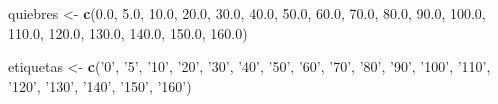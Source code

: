 \documentclass[
  12pt]{article}
\newenvironment{Shaded}{}{}
\newcommand{\FloatTok}[1]{\textcolor[rgb]{0.25,0.63,0.44}{#1}}
\newcommand{\KeywordTok}[1]{\textcolor[rgb]{0.00,0.44,0.13}{\textbf{#1}}}
\newcommand{\NormalTok}[1]{#1}
\newcommand{\StringTok}[1]{\textcolor[rgb]{0.25,0.44,0.63}{#1}}
\begin{document}
\begin{Shaded}
\begin{Highlighting}[]
{{{{{{{{{{\NormalTok{quiebres <-}\StringTok{ }\KeywordTok{c}\NormalTok{(}\FloatTok{0.0}\NormalTok{, }\FloatTok{5.0}\NormalTok{, }\FloatTok{10.0}\NormalTok{, }\FloatTok{20.0}\NormalTok{, }\FloatTok{30.0}\NormalTok{, }\FloatTok{40.0}\NormalTok{, }\FloatTok{50.0}\NormalTok{, }
              \FloatTok{60.0}\NormalTok{, }\FloatTok{70.0}\NormalTok{, }\FloatTok{80.0}\NormalTok{, }\FloatTok{90.0}\NormalTok{, }\FloatTok{100.0}\NormalTok{, }\FloatTok{110.0}\NormalTok{, }
              \FloatTok{120.0}\NormalTok{, }\FloatTok{130.0}\NormalTok{, }\FloatTok{140.0}\NormalTok{, }\FloatTok{150.0}\NormalTok{, }\FloatTok{160.0}\NormalTok{)}

\NormalTok{etiquetas <-}\StringTok{ }\KeywordTok{c}\NormalTok{(}\StringTok{'0'}\NormalTok{, }\StringTok{'5'}\NormalTok{, }\StringTok{'10'}\NormalTok{, }\StringTok{'20'}\NormalTok{, }\StringTok{'30'}\NormalTok{, }\StringTok{'40'}\NormalTok{, }\StringTok{'50'}\NormalTok{,}
               \StringTok{'60'}\NormalTok{, }\StringTok{'70'}\NormalTok{, }\StringTok{'80'}\NormalTok{, }\StringTok{'90'}\NormalTok{, }\StringTok{'100'}\NormalTok{, }\StringTok{'110'}\NormalTok{, }
               \StringTok{'120'}\NormalTok{, }\StringTok{'130'}\NormalTok{, }\StringTok{'140'}\NormalTok{, }\StringTok{'150'}\NormalTok{, }\StringTok{'160'}\NormalTok{)}

}}}}}}}}}}
\end{Highlighting}
\end{Shaded}
\end{document}
